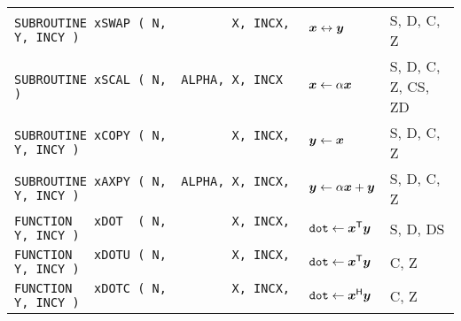 \documentclass[10pt,a3paper, landscape]{article}
\newcommand{\T}{\mathsf{T}}
\renewcommand{\H}{\mathsf{H}}
\begin{document}
\begin{tabular}{ll>{\ttfamily}l}
		\verb|SUBROUTINE xSWAP ( N,         X, INCX, Y, INCY )                                         | & $\vb*{x} \leftrightarrow \vb*{y}$                                                                                                                                                                                                                            & S, D, C, Z         \\
		\verb|SUBROUTINE xSCAL ( N,  ALPHA, X, INCX )                                                  | & $\vb*{x} \gets \alpha \vb*{x}$                                                                                                                                                                                                                               & S, D, C, Z, CS, ZD \\
		\verb|SUBROUTINE xCOPY ( N,         X, INCX, Y, INCY )                                         | & $\vb*{y} \gets \vb*{x}$                                                                                                                                                                                                                                      & S, D, C, Z         \\
		\verb|SUBROUTINE xAXPY ( N,  ALPHA, X, INCX, Y, INCY )                                         | & $\vb*{y} \gets \alpha \vb*{x} + \vb*{y}$                                                                                                                                                                                                                     & S, D, C, Z         \\
		\verb|FUNCTION   xDOT  ( N,         X, INCX, Y, INCY )                                         | & $\texttt{dot} \gets \vb*{x}^{\T} \vb*{y}$                                                                                                                                                                                                                    & S, D, DS           \\
		\verb|FUNCTION   xDOTU ( N,         X, INCX, Y, INCY )                                         | & $\texttt{dot} \gets \vb*{x}^{\T} \vb*{y}$                                                                                                                                                                                                                    & C, Z               \\
		\verb|FUNCTION   xDOTC ( N,         X, INCX, Y, INCY )                                         | & $\texttt{dot} \gets \vb*{x}^{\H} \vb*{y}$                                                                                                                                                                                                                    & C, Z               \\

\end{tabular}
\end{document}
